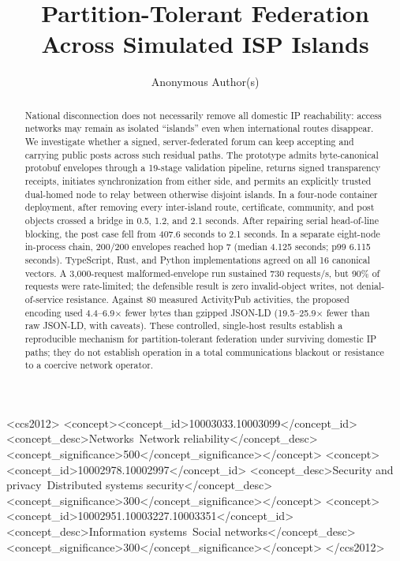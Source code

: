 \documentclass[sigconf,anonymous]{acmart}
\begin{document}
\title{Partition-Tolerant Federation Across Simulated ISP Islands}
\author{Anonymous Author(s)}

\begin{abstract}
National disconnection does not necessarily remove all domestic IP reachability: access networks may
remain as isolated ``islands'' even when international routes disappear. We investigate whether a
signed, server-federated forum can keep accepting and carrying public posts across such residual
paths. The prototype admits byte-canonical protobuf envelopes through a 19-stage validation pipeline,
returns signed transparency receipts, initiates synchronization from either side, and permits an
explicitly trusted dual-homed node to relay between otherwise disjoint islands. In a four-node
container deployment, after removing every inter-island route, certificate, community, and post
objects crossed a bridge in 0.5, 1.2, and 2.1 seconds. After repairing serial head-of-line blocking,
the post case fell from 407.6 seconds to 2.1 seconds. In a separate eight-node in-process chain,
200/200 envelopes reached hop 7 (median 4.125 seconds; p99 6.115 seconds). TypeScript, Rust, and Python
implementations agreed on all 16 canonical vectors. A 3,000-request malformed-envelope run sustained
730 requests/s, but 90\% of requests were rate-limited; the defensible result is zero invalid-object
writes, not denial-of-service resistance. Against 80 measured ActivityPub activities, the proposed
encoding used 4.4--6.9$\times$ fewer bytes than gzipped JSON-LD (19.5--25.9$\times$ fewer than raw
JSON-LD, with caveats). These controlled, single-host results establish a reproducible mechanism for
partition-tolerant federation under surviving domestic IP paths; they do not establish operation in
a total communications blackout or resistance to a coercive network operator.
\end{abstract}

\begin{CCSXML}
<ccs2012>
 <concept><concept_id>10003033.10003099</concept_id>
 <concept_desc>Networks~Network reliability</concept_desc><concept_significance>500</concept_significance></concept>
 <concept><concept_id>10002978.10002997</concept_id>
 <concept_desc>Security and privacy~Distributed systems security</concept_desc><concept_significance>300</concept_significance></concept>
 <concept><concept_id>10002951.10003227.10003351</concept_id>
 <concept_desc>Information systems~Social networks</concept_desc><concept_significance>300</concept_significance></concept>
</ccs2012>
\end{CCSXML}
\end{document}
